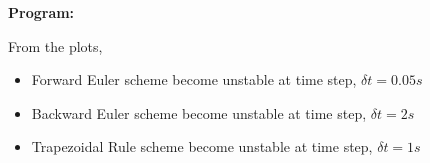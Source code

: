 \documentclass[a4paper,11pt]{report}
\begin{document}
\begin{enumerate}
\begin{enumerate}
    \end{enumerate}

    \vspace{1 cm}

    \textbf{Program:}
    

    \vspace{1 cm}

    From the plots, 
    \begin{itemize}
    \item Forward Euler scheme become unstable at time step, $\delta t = 0.05s$
    \item Backward Euler scheme become unstable at time step, $\delta t = 2s$
    \item Trapezoidal Rule scheme become unstable at time step, $\delta t = 1s$
    \end{itemize}

    \begin{figure}[ht!]
    \centering
    \resizebox{0.95\linewidth}{!}{}
    \end{figure}

    \begin{figure}[ht!]
    \centering
    \resizebox{0.95\linewidth}{!}{}
    \end{figure}

    \begin{figure}[ht!]
    \centering
    \resizebox{0.95\linewidth}{!}{}
    \end{figure}

    \begin{figure}[ht!]
    \centering
    \resizebox{0.95\linewidth}{!}{}
    \end{figure}
    
    \begin{figure}[ht!]
    \centering
    \resizebox{0.95\linewidth}{!}{}
    \end{figure}

    \begin{figure}[ht!]
    \centering
    \resizebox{0.95\linewidth}{!}{}
    \end{figure}

    \begin{figure}[ht!]
    \centering
    \resizebox{0.95\linewidth}{!}{}
    \end{figure}


\end{enumerate}
\end{document}
